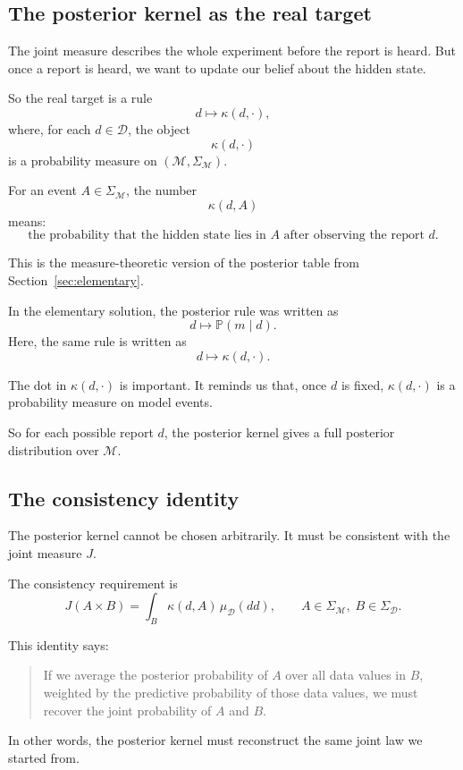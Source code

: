 \documentclass[11pt]{article}
\newcommand{\M}{\mathcal{M}}
\newcommand{\D}{\mathcal{D}}
\newcommand{\SigmaM}{\Sigma_{\M}}
\newcommand{\SigmaD}{\Sigma_{\D}}
\newcommand{\muD}{\mu_{\D}}
\begin{document}
\subsection{The posterior kernel as the real target}

The joint measure describes the whole experiment before the report is heard. But once a report is heard, we want to update our belief about the hidden state.

So the real target is a rule
\[
    d\longmapsto \kappa(d,\cdot),
\]
where, for each \(d\in\D\), the object
\[
    \kappa(d,\cdot)
\]
is a probability measure on \((\M,\SigmaM)\).

For an event \(A\in\SigmaM\), the number
\[
    \kappa(d,A)
\]
means:
\[
    \text{the probability that the hidden state lies in }A
    \text{ after observing the report }d.
\]

This is the measure-theoretic version of the posterior table from Section~\ref{sec:elementary}.

In the elementary solution, the posterior rule was written as
\[
    d\longmapsto \mathbb{P}(m\mid d).
\]
Here, the same rule is written as
\[
    d\longmapsto \kappa(d,\cdot).
\]

The dot in \(\kappa(d,\cdot)\) is important. It reminds us that, once \(d\) is fixed, \(\kappa(d,\cdot)\) is a probability measure on model events.

So for each possible report \(d\), the posterior kernel gives a full posterior distribution over \(\M\).

\subsection{The consistency identity}

The posterior kernel cannot be chosen arbitrarily. It must be consistent with the joint measure \(J\).

The consistency requirement is
\[
    J(A\times B)
    =
    \int_B \kappa(d,A)\,\muD(dd),
    \qquad
    A\in\SigmaM,\; B\in\SigmaD.
\]

This identity says:

\begin{quote}
    If we average the posterior probability of \(A\) over all data values in \(B\), weighted by the predictive probability of those data values, we must recover the joint probability of \(A\) and \(B\).
\end{quote}

In other words, the posterior kernel must reconstruct the same joint law we started from.
\end{document}
